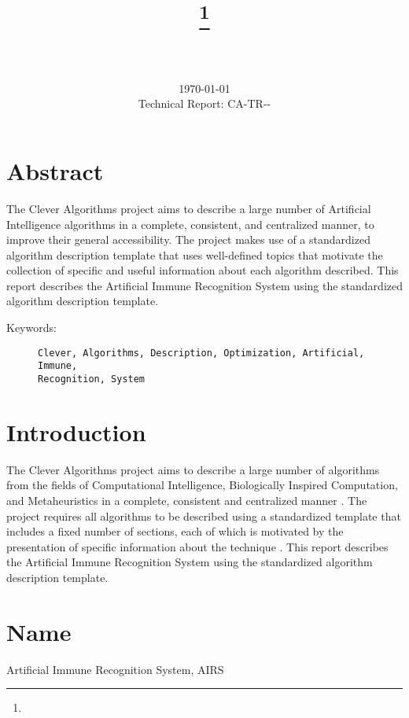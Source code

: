\documentclass[a4paper, 11pt]{article}
\title{{\myreporttitle}\footnote{\myreportlicense}}
\author{\myreportauthor\\{\myreportemail}\\\small\myreportproject}
\date{\today\\{\small{Technical Report: CA-TR-{\myreportdate}-\myreportversion}}}
\begin{document}
\maketitle

\section*{Abstract} 
The Clever Algorithms project aims to describe a large number of Artificial Intelligence algorithms in a complete, consistent, and centralized manner, to improve their general accessibility. 
The project makes use of a standardized algorithm description template that uses well-defined topics that motivate the collection of specific and useful information about each algorithm described.
This report describes the Artificial Immune Recognition System using the standardized algorithm description template.

\begin{description}
	\item[Keywords:] {\small\texttt{Clever, Algorithms, Description, Optimization, Artificial, Immune, \\Recognition, System}}
\end{description} 

\section{Introduction} 
\label{sec:intro}
The Clever Algorithms project aims to describe a large number of algorithms from the fields of Computational Intelligence, Biologically Inspired Computation, and Metaheuristics in a complete, consistent and centralized manner \cite{Brownlee2010}.
The project requires all algorithms to be described using a standardized template that includes a fixed number of sections, each of which is motivated by the presentation of specific information about the technique \cite{Brownlee2010a}.
This report describes the Artificial Immune Recognition System using the standardized algorithm description template.

\section{Name} 
\label{sec:name}
Artificial Immune Recognition System, AIRS
\end{document}
